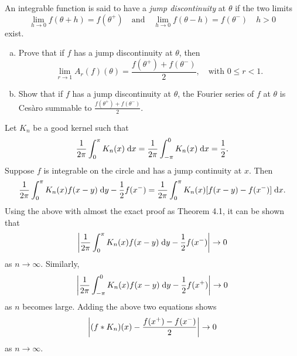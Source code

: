 \begin{exrc}[17]
    An integrable function is said to have a \emph{jump discontinuity} at \(\theta\)
    if the two limits
    \begin{equation*}
        \lim_{h \to 0} f(\theta + h) = f(\theta^+) \quad \text{and} \quad
        \lim_{h \to 0} f(\theta - h) = f(\theta^-) \quad h > 0
    \end{equation*}
    exist.

    \begin{enumerate}[(a)]
    \item
        Prove that if \(f\) has a jump discontinuity at \(\theta\), then
        \begin{equation*}
            \lim_{r \to 1} A_r(f)(\theta) = \frac{f(\theta^+) + f(\theta^-)}{2},
            \quad \text{with \(0 \leq r < 1\)}.
        \end{equation*}
    
    \item
        Show that if \(f\) has a jump discontinuity at \(\theta\),
        the Fourier series of \(f\) at \(\theta\) is Cesàro summable
        to \(\frac{f(\theta^+) + f(\theta^-)}{2}\).
        
    \end{enumerate}

\begin{soln}
    Let \(K_n\) be a good kernel such that
    \begin{equation*}
        \frac{1}{2\pi} \int_{0}^{\pi} K_n(x) \;\mathrm d x
        = \frac{1}{2\pi} \int_{-\pi}^{0} K_n(x) \;\mathrm d x
        = \frac{1}{2}.
    \end{equation*}
    Suppose \(f\) is integrable on the circle
    and has a jump continuity at \(x \).
    Then
    \begin{equation*}
        \frac{1}{2\pi} \int_{0}^{\pi} K_n(x) f(x - y) \;\mathrm d y - \frac{1}{2} f(x^-)
        = \frac{1}{2\pi} \int_{0}^{\pi} K_n(x) [f(x - y) - f(x^-)] \;\mathrm d x.
    \end{equation*}
    Using the above with almost the exact proof as Theorem 4.1, it can be shown that
    \begin{equation*}
        \abs{\frac{1}{2\pi} \int_{0}^{\pi} K_n(x) f(x - y) \ud y - \frac{1}{2}f(x^-)}
        \to 0
    \end{equation*}
    as \(n \to \infty\).
    Similarly,
    \begin{equation*}
        \abs{\frac{1}{2\pi} \int_{-\pi}^{0} K_n(x) f(x - y) \ud y - \frac{1}{2}f(x^+)}
        \to 0
    \end{equation*}
    as \(n\) becomes large.
    Adding the above two equations shows
    \begin{equation*}
        \abs{(f * K_n)(x) - \frac{f(x^+) - f(x^-)}{2}} \to 0
    \end{equation*}
    as \(n \to \infty\).


\end{soln}
\end{exrc}
